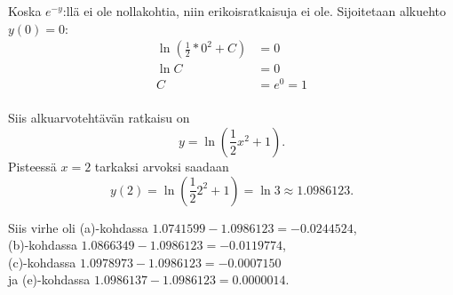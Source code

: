 \documentclass{article}
\begin{document}
Koska $e^{-y}$:llä ei ole nollakohtia, niin erikoisratkaisuja ei ole.
Sijoitetaan alkuehto $y(0) = 0$:
\begin{align*}
  \ln (\frac{1}{2}*0^2 + C) &= 0 \\
  \ln C &= 0 \\
  C &= e^0 = 1 \\
\end{align*}

Siis alkuarvotehtävän ratkaisu on
\[
  y = \ln (\frac{1}{2}x^2 + 1).
\]
Pisteessä $x = 2$ tarkaksi arvoksi saadaan
\[
  y(2) = \ln (\frac{1}{2}2^2 + 1) = \ln 3 \approx 1.0986123.
\]

Siis virhe oli (a)-kohdassa $1.0741599 - 1.0986123 = -0.0244524$,\\
(b)-kohdassa $1.0866349 - 1.0986123 = -0.0119774$,\\
(c)-kohdassa $1.0978973 - 1.0986123 = -0.0007150$\\
ja (e)-kohdassa $1.0986137 - 1.0986123 = 0.0000014$.
\end{document}
